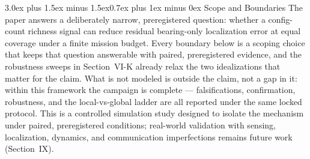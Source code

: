 \documentclass[journal]{IEEEtran}
\makeatletter
\renewcommand{\section}{\@startsection{section}{1}{\z@}%
{3.0ex plus 1.5ex minus 1.5ex}{0.7ex plus 1ex minus 0ex}%
{\normalfont\large\bfseries\scshape\centering}}
\makeatother
\begin{document}
\section{Scope and Boundaries}
The paper answers a deliberately narrow, preregistered question: whether a
config-count richness signal can reduce residual bearing-only localization
error at equal coverage under a finite mission budget. Every boundary below is
a scoping choice that keeps that question answerable with paired,
preregistered evidence, and the robustness sweeps in Section~VI-K already
relax the two idealizations that matter for the claim. What is not modeled is
outside the claim, not a gap in it: within this framework the campaign is
complete --- falsifications, confirmation, robustness, and the local-vs-global
ladder are all reported under the same locked protocol.
This is a controlled simulation study designed to isolate the mechanism under
paired, preregistered conditions; real-world validation with sensing,
localization, dynamics, and communication imperfections remains future work
(Section~IX).
\end{document}
